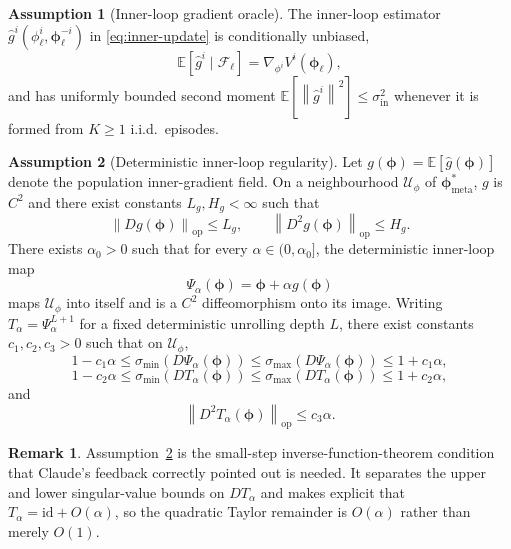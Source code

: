\documentclass[11pt]{article}
\theoremstyle{definition}
\newtheorem{assumption}{Assumption}
\newtheorem{remark}[theorem]{Remark}
\newcommand{\E}{\mathbb{E}}
\newcommand{\norm}[1]{\left\lVert #1 \right\rVert}
\newcommand{\calF}{\mathcal{F}}
\newcommand{\calU}{\mathcal{U}}
\newcommand{\meta}{\mathrm{meta}}
\begin{document}
\begin{assumption}[Inner-loop gradient oracle]\label{ass:inner-oracle}
The inner-loop estimator $\hat g^i(\phi^i_\ell,\bm\phi^{-i}_\ell)$ in \eqref{eq:inner-update} is conditionally unbiased,
\[\E[\hat g^i\mid\calF_\ell]=\nabla_{\phi^i}V^i(\bm\phi_\ell),\]
and has uniformly bounded second moment $\E[\norm{\hat g^i}^2]\le\sigma_{\mathrm{in}}^2$ whenever it is formed from $K\ge 1$ i.i.d.\ episodes.
\end{assumption}

\begin{assumption}[Deterministic inner-loop regularity]\label{ass:contraction}
Let $g(\bm\phi)=\E[\hat g(\bm\phi)]$ denote the population inner-gradient field. On a neighbourhood $\calU_\phi$ of $\bm\phi^*_\meta$, $g$ is $C^2$ and there exist constants $L_g,H_g<\infty$ such that
\begin{equation*}
\norm{Dg(\bm\phi)}_{\mathrm{op}}\le L_g,\qquad
\norm{D^2g(\bm\phi)}_{\mathrm{op}}\le H_g.
\end{equation*}
There exists $\alpha_0>0$ such that for every $\alpha\in(0,\alpha_0]$, the deterministic inner-loop map
\begin{equation*}
\Psi_\alpha(\bm\phi)=\bm\phi+\alpha g(\bm\phi)
\end{equation*}
maps $\calU_\phi$ into itself and is a $C^2$ diffeomorphism onto its image. Writing $T_\alpha=\Psi_\alpha^{L+1}$ for a fixed deterministic unrolling depth $L$, there exist constants $c_1,c_2,c_3>0$ such that on $\calU_\phi$,
\begin{equation*}
1-c_1\alpha\le \sigma_{\min}(D\Psi_\alpha(\bm\phi))\le \sigma_{\max}(D\Psi_\alpha(\bm\phi))\le 1+c_1\alpha,
\end{equation*}
\begin{equation*}
1-c_2\alpha\le \sigma_{\min}(DT_\alpha(\bm\phi))\le \sigma_{\max}(DT_\alpha(\bm\phi))\le 1+c_2\alpha,
\end{equation*}
and
\begin{equation*}
\norm{D^2T_\alpha(\bm\phi)}_{\mathrm{op}}\le c_3\alpha.
\end{equation*}
\end{assumption}

\begin{remark}\label{rem:contraction}
Assumption~\ref{ass:contraction} is the small-step inverse-function-theorem condition that Claude's feedback correctly pointed out is needed. It separates the upper and lower singular-value bounds on $DT_\alpha$ and makes explicit that $T_\alpha=\mathrm{id}+O(\alpha)$, so the quadratic Taylor remainder is $O(\alpha)$ rather than merely $O(1)$.
\end{remark}
\end{document}
